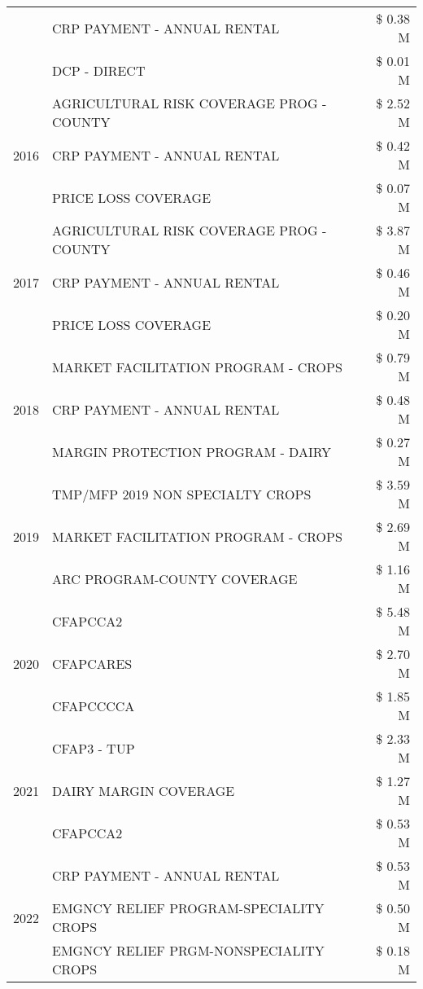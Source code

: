 \begin{tabular}{llr}
 & CRP PAYMENT - ANNUAL RENTAL & \$ 0.38 M \\
 & DCP - DIRECT & \$ 0.01 M \\
\cline{1-3}
\multirow[t]{3}{*}{2016} & AGRICULTURAL RISK COVERAGE PROG - COUNTY & \$ 2.52 M \\
 & CRP PAYMENT - ANNUAL RENTAL & \$ 0.42 M \\
 & PRICE LOSS COVERAGE & \$ 0.07 M \\
\cline{1-3}
\multirow[t]{3}{*}{2017} & AGRICULTURAL RISK COVERAGE PROG - COUNTY & \$ 3.87 M \\
 & CRP PAYMENT - ANNUAL RENTAL & \$ 0.46 M \\
 & PRICE LOSS COVERAGE & \$ 0.20 M \\
\cline{1-3}
\multirow[t]{3}{*}{2018} & MARKET FACILITATION PROGRAM - CROPS & \$ 0.79 M \\
 & CRP PAYMENT - ANNUAL RENTAL & \$ 0.48 M \\
 & MARGIN PROTECTION PROGRAM - DAIRY & \$ 0.27 M \\
\cline{1-3}
\multirow[t]{3}{*}{2019} & TMP/MFP 2019 NON SPECIALTY CROPS & \$ 3.59 M \\
 & MARKET FACILITATION PROGRAM - CROPS & \$ 2.69 M \\
 & ARC PROGRAM-COUNTY COVERAGE & \$ 1.16 M \\
\cline{1-3}
\multirow[t]{3}{*}{2020} & CFAPCCA2 & \$ 5.48 M \\
 & CFAPCARES & \$ 2.70 M \\
 & CFAPCCCCA & \$ 1.85 M \\
\cline{1-3}
\multirow[t]{3}{*}{2021} & CFAP3 - TUP & \$ 2.33 M \\
 & DAIRY MARGIN COVERAGE & \$ 1.27 M \\
 & CFAPCCA2 & \$ 0.53 M \\
\cline{1-3}
\multirow[t]{3}{*}{2022} & CRP PAYMENT - ANNUAL RENTAL & \$ 0.53 M \\
 & EMGNCY RELIEF PROGRAM-SPECIALITY CROPS & \$ 0.50 M \\
 & EMGNCY RELIEF PRGM-NONSPECIALITY CROPS & \$ 0.18 M \\
\cline{1-3}
\bottomrule
\end{tabular}
